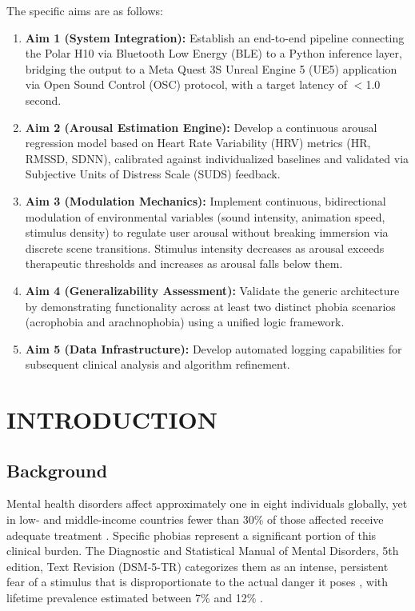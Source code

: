 \documentclass[conference]{IEEEtran}
\begin{document}
The specific aims are as follows:

\begin{enumerate}
    \item \textbf{Aim 1 (System Integration):} Establish an end-to-end pipeline connecting the Polar H10 via Bluetooth Low Energy (BLE) to a Python inference layer, bridging the output to a Meta Quest 3S Unreal Engine 5 (UE5) application via Open Sound Control (OSC) protocol, with a target latency of $<$1.0 second.

    \item \textbf{Aim 2 (Arousal Estimation Engine):} Develop a continuous arousal regression model based on Heart Rate Variability (HRV) metrics (HR, RMSSD, SDNN), calibrated against individualized baselines and validated via Subjective Units of Distress Scale (SUDS) feedback.

    \item \textbf{Aim 3 (Modulation Mechanics):} Implement continuous, bidirectional modulation of environmental variables (sound intensity, animation speed, stimulus density) to regulate user arousal without breaking immersion via discrete scene transitions. Stimulus intensity decreases as arousal exceeds therapeutic thresholds and increases as arousal falls below them.

    \item \textbf{Aim 4 (Generalizability Assessment):} Validate the generic architecture by demonstrating functionality across at least two distinct phobia scenarios (acrophobia and arachnophobia) using a unified logic framework.

    \item \textbf{Aim 5 (Data Infrastructure):} Develop automated logging capabilities for subsequent clinical analysis and algorithm refinement.
\end{enumerate}

\section{INTRODUCTION}

\subsection{Background}

Mental health disorders affect approximately one in eight individuals globally, yet in low- and middle-income countries fewer than 30\% of those affected receive adequate treatment \cite{roccaforte2026}. Specific phobias represent a significant portion of this clinical burden. The Diagnostic and Statistical Manual of Mental Disorders, 5th edition, Text Revision (DSM-5-TR) categorizes them as an intense, persistent fear of a stimulus that is disproportionate to the actual danger it poses \cite{dsm5tr2022}, with lifetime prevalence estimated between 7\% and 12\% \cite{krijn2004}.
\end{document}
